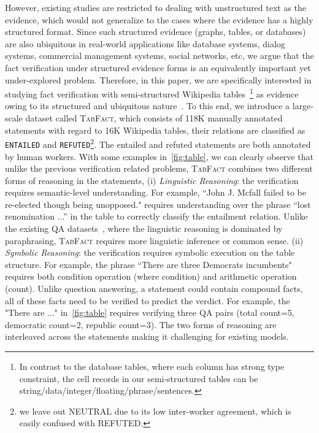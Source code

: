 \documentclass{article} \usepackage{iclr2020_conference,times}
\begin{document}
However, existing studies are restricted to dealing with unstructured text as the evidence, which would not generalize to the cases where the evidence has a highly structured format. Since such structured evidence (graphs, tables, or databases) are also ubiquitous in real-world applications like database systems, dialog systems, commercial management systems, social networks, etc, we argue that the fact verification under structured evidence forms is an equivalently important yet under-explored problem. Therefore, in this paper, we are specifically interested in studying fact verification with semi-structured Wikipedia tables~\citep{bhagavatula2013methods}\footnote{In contrast to the database tables, where each column has strong type constraint, the cell records in our semi-structured tables can be string/data/integer/floating/phrase/sentences.} as evidence owing to its structured and ubiquitous nature~\citep{jauhar2016tables,zhong2017seq2sql,pasupat2015compositional}. To this end, we introduce a large-scale dataset called \textsc{TabFact}, which consists of 118K manually annotated statements with regard to 16K Wikipedia tables, their relations are classified as {\tt ENTAILED} and {\tt REFUTED}\footnote{we leave out NEUTRAL due to its low inter-worker agreement, which is easily confused with REFUTED.}. The entailed and refuted statements are both annotated by human workers. With some examples in~\autoref{fig:table}, we can clearly observe that unlike the previous verification related problems, \textsc{TabFact} combines two different forms of reasoning in the statements, (i) \emph{Linguistic Reasoning}: the verification requires semantic-level understanding. For example, ``John J. Mcfall failed to be re-elected though being unopposed." requires understanding over the phrase ``lost renomination ...'' in the table to correctly classify the entailment relation. Unlike the existing QA datasets~\citep{zhong2017seq2sql,pasupat2015compositional}, where the linguistic reasoning is dominated by paraphrasing, \textsc{TabFact} requires more linguistic inference or common sense. (ii) \emph{Symbolic Reasoning}: the verification requires symbolic execution on the table structure. For example, the phrase ``There are three Democrats incumbents" requires both condition operation (where condition) and arithmetic operation (count). Unlike question answering, a statement could contain compound facts, all of these facts need to be verified to predict the verdict. For example, the "There are ..." in~\autoref{fig:table} requires verifying three QA pairs (total count=5, democratic count=2, republic count=3). The two forms of reasoning are interleaved across the statements making it challenging for existing models.
\end{document}
